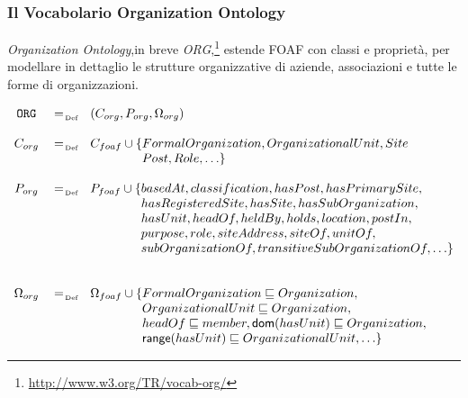 \documentclass[8pt]{beamer}
\begin{document}
\begin{frame}
\frametitle{Il Vocabolario Organization Ontology}
\emph{Organization Ontology},in breve \emph{ORG},\footnote{\url{http://www.w3.org/TR/vocab-org/}}
estende FOAF con classi e propriet\`a, per modellare in dettaglio 
le strutture organizzative di aziende, associazioni e tutte le forme 
di organizzazioni.
\vspace{\baselineskip}



\[
 \begin{array}{ccl}
 \org & \defAs & (C_{org}, P_{org}, \Omega_{org}) \\
 &&\\
 C_{org} & \defAs & C_{foaf} \cup \{FormalOrganization, OrganizationalUnit,  Site \\
 && \phantom{C_{foaf} \cup \{}Post, Role, \ldots \}\\
 &&\\
 P_{org} & \defAs & P_{foaf} \cup \{ basedAt, classification, hasPost, hasPrimarySite, \\
 &&\phantom{P_{foaf} \cup \{}hasRegisteredSite, hasSite, hasSubOrganization, \\
 &&\phantom{P_{foaf} \cup \{}hasUnit, headOf, heldBy, holds, location, postIn,\\
 &&\phantom{P_{foaf} \cup \{}purpose, role, siteAddress, siteOf, unitOf, \\
 &&\phantom{P_{foaf} \cup \{}subOrganizationOf,  transitiveSubOrganizationOf, \ldots \}\\
 &&\phantom{P_{foaf} \cup \{}  \\
 &&\\
 \Omega_{org} & \defAs & \Omega_{foaf} \cup \{ FormalOrganization \Issub Organization, \\
 &&\phantom{\Omega_{foaf} \cup \{}OrganizationalUnit \Issub Organization,\\
 &&\phantom{\Omega_{foaf} \cup \{}headOf \Issub member, \dom(hasUnit)\Issub Organization, \\
 &&\phantom{\Omega_{foaf} \cup \{}\range(hasUnit) \Issub OrganizationalUnit, \ldots \}
 \end{array}
\]
\phantom{NOTA: I vincoli semantici esplicitano la relazione tra i due vocabolari.}
\end{frame}
\end{document}
